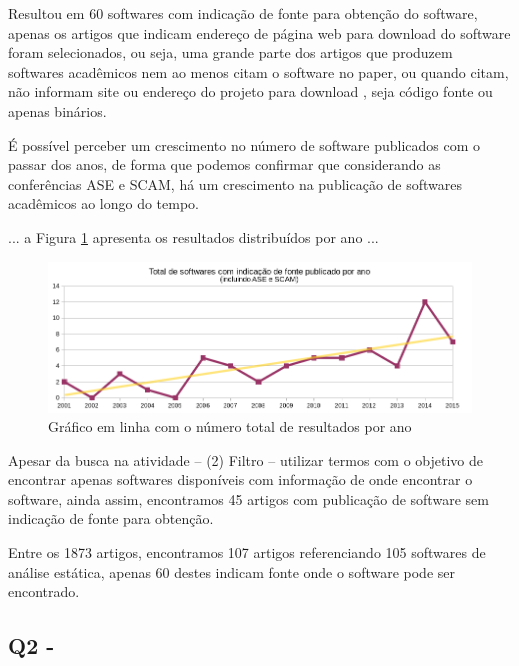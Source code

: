 
Resultou em 60 softwares com indicação de fonte para obtenção do
software, apenas os artigos que indicam endereço de página web para download do
software foram selecionados, ou seja, uma grande parte dos artigos que produzem
softwares acadêmicos nem ao menos citam o software no paper, ou quando citam,
não informam site ou endereço do projeto para download
\cite{allen2017engineering}, seja código fonte ou apenas binários.

É possível perceber um crescimento no número de software publicados com o
passar dos anos, de forma que podemos confirmar que considerando as
conferências ASE e SCAM, há um crescimento na publicação de softwares
acadêmicos ao longo do tempo.

... a Figura \ref{softwares-por-ano} apresenta os resultados distribuídos por ano ...

\begin{figure}[h]
  \center
  \includegraphics[scale=0.65]{imagens/softwares-por-ano.png}
  \caption{Gráfico em linha com o número total de resultados por ano}
  \label{softwares-por-ano}
\end{figure}

Apesar da busca na atividade -- (2) Filtro -- utilizar termos com o objetivo de
encontrar apenas softwares disponíveis com informação de onde encontrar o
software, ainda assim, encontramos 45 artigos com publicação de software sem
indicação de fonte para obtenção.

Entre os 1873 artigos, encontramos 107 artigos referenciando 105 softwares de
análise estática, apenas 60 destes indicam fonte onde o software pode ser
encontrado.

\subsection{Q2 - \QuestaoDois}

